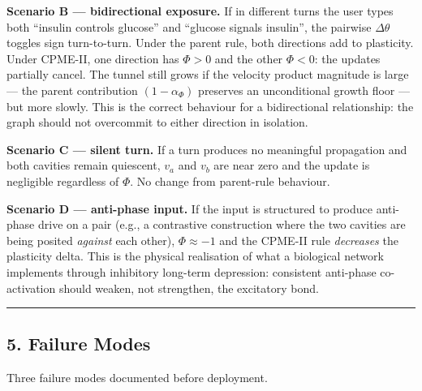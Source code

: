 \documentclass[
  11pt,
  a4paper,
]{article}
\begin{document}
\textbf{Scenario B --- bidirectional exposure.} If in different turns
the user types both ``insulin controls glucose'' and ``glucose signals
insulin'', the pairwise \(\Delta \theta\) toggles sign turn-to-turn.
Under the parent rule, both directions add to plasticity. Under CPME-II,
one direction has \(\Phi > 0\) and the other \(\Phi < 0\): the updates
partially cancel. The tunnel still grows if the velocity product
magnitude is large --- the parent contribution \((1 - \alpha_\Phi)\)
preserves an unconditional growth floor --- but more slowly. This is the
correct behaviour for a bidirectional relationship: the graph should not
overcommit to either direction in isolation.

\textbf{Scenario C --- silent turn.} If a turn produces no meaningful
propagation and both cavities remain quiescent, \(v_a\) and \(v_b\) are
near zero and the update is negligible regardless of \(\Phi\). No change
from parent-rule behaviour.

\textbf{Scenario D --- anti-phase input.} If the input is structured to
produce anti-phase drive on a pair (e.g., a contrastive construction
where the two cavities are being posited \emph{against} each other),
\(\Phi \approx -1\) and the CPME-II rule \emph{decreases} the plasticity
delta. This is the physical realisation of what a biological network
implements through inhibitory long-term depression: consistent
anti-phase co-activation should weaken, not strengthen, the excitatory
bond.

\begin{center}\rule{0.5\linewidth}{0.5pt}\end{center}

\subsection{5. Failure Modes}\label{failure-modes}

Three failure modes documented before deployment.
\end{document}
